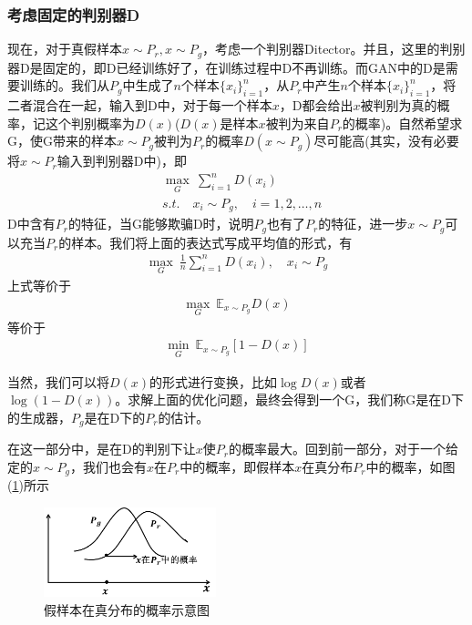             \subsubsection{考虑固定的判别器D}
            \par
            现在，对于真假样本$x\sim P_r,x\sim P_g$，考虑一个判别器Ditector。并且，这里的判别器D是固定的，即D已经训练好了，在训练过程中D不再训练。而GAN中的D是需要训练的。我们从$P_g$中生成了$n$个样本$\{x_i\}_{i=1}^n$，从$P_r$中产生$n$个样本$\{x_i\}_{i=1}^n$，将二者混合在一起，输入到D中，对于每一个样本$x$，D都会给出$x$被判别为真的概率，记这个判别概率为$D(x)$($D(x)$是样本$x$被判为来自$P_r$的概率)。自然希望求G，使G带来的样本$x\sim P_g$被判为$P_r$的概率$D(x\sim P_g)$尽可能高(其实，没有必要将$x\sim P_r$输入到判别器D中)，即
            \begin{align*}
            & \max _G\ \sum_{i=1}^n D(x_i)\\
            & s.t. \quad x_i\sim P_g,\quad i=1,2,\dots,n
            \end{align*}
            D中含有$P_r$的特征，当G能够欺骗D时，说明$P_g$也有了$P_r$的特征，进一步$x\sim P_g$可以充当$P_r$的样本。我们将上面的表达式写成平均值的形式，有
            \begin{align*}
            \max _G \ \frac{1}{n}\sum_{i=1}^n D(x_i) ,\quad x_i \sim P_g
            \end{align*}
            上式等价于
            \begin{align*}
            \max_G\ \mathbb{E}_{x\sim P_g} D(x)
            \end{align*}
            等价于
            \begin{align*}
            \min _G \ \mathbb{E}_{x\sim P_g}[1-D(x)]
            \end{align*}
            \par
            当然，我们可以将$D(x)$的形式进行变换，比如$\log D(x)$或者$\log (1-D(x))$。求解上面的优化问题，最终会得到一个G，我们称G是在D下的生成器，$P_g$是在D下的$P_r$的估计。
            \par
            在这一部分中，是在D的判别下让$x$使$P_r$的概率最大。回到前一部分，对于一个给定的$x\sim P_g$，我们也会有$x$在$P_r$中的概率，即假样本$x$在真分布$P_r$中的概率，如图(\ref{fig:假样本在真分布的概率示意图})所示
                \begin{figure}[H]
                \centering
                \includegraphics[width=5cm]{images/fault_sample_in_real_distribution.jpg}
                \caption{假样本在真分布的概率示意图}
                \label{fig:假样本在真分布的概率示意图}
                \end{figure}
